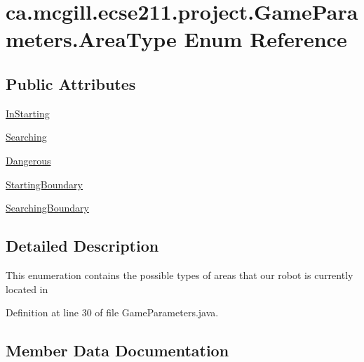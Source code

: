 \hypertarget{enumca_1_1mcgill_1_1ecse211_1_1project_1_1_game_parameters_1_1_area_type}{}\section{ca.\+mcgill.\+ecse211.\+project.\+Game\+Parameters.\+Area\+Type Enum Reference}
\label{enumca_1_1mcgill_1_1ecse211_1_1project_1_1_game_parameters_1_1_area_type}
\subsection*{Public Attributes}
\begin{DoxyCompactItemize}
\item 
\hyperlink{enumca_1_1mcgill_1_1ecse211_1_1project_1_1_game_parameters_1_1_area_type_a90e9cb33114c7af62aa86684942265e5}{In\+Starting}
\item 
\hyperlink{enumca_1_1mcgill_1_1ecse211_1_1project_1_1_game_parameters_1_1_area_type_a25564076fdd8880377fbd6eaf753456f}{Searching}
\item 
\hyperlink{enumca_1_1mcgill_1_1ecse211_1_1project_1_1_game_parameters_1_1_area_type_ac762256f8b33e7c93c162520a0349769}{Dangerous}
\item 
\hyperlink{enumca_1_1mcgill_1_1ecse211_1_1project_1_1_game_parameters_1_1_area_type_afd78c1184c6b82e22bb08ed39ae4e83b}{Starting\+Boundary}
\item 
\hyperlink{enumca_1_1mcgill_1_1ecse211_1_1project_1_1_game_parameters_1_1_area_type_a5a3aceb665ba97ac242e77955feed640}{Searching\+Boundary}
\end{DoxyCompactItemize}


\subsection{Detailed Description}
This enumeration contains the possible types of areas that our robot is currently located in 

Definition at line 30 of file Game\+Parameters.\+java.



\subsection{Member Data Documentation}
\mbox{\label{enumca_1_1mcgill_1_1ecse211_1_1project_1_1_game_parameters_1_1_area_type_ac762256f8b33e7c93c162520a0349769}} 
